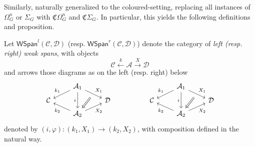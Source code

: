 \documentclass[a4paper,10pt
,draft
]{article}%
\renewcommand{\phi}{\varphi}
\newcommand{\UC}{\underline{\mathfrak C}}
\begin{document}
Similarly, \cite[Prop 3.47, 3.90, 4.12, 4.15, 4.26, 4.30]{BP17} naturally generalized to the coloured-setting,
replacing all instances of $\Omega_G^n$ or $\Sigma_G$ with $\UC\Omega_G^n$ and $\UC\Sigma_G$.
In particular, this yields the following definitions and proposition.
\begin{definition}[{cf. \cite[Defn 4.3]{BP17}}]
      Let $\mathsf{WSpan}^l(\mathcal C, \mathcal D)$ (resp. $\mathsf{WSpan}^r(\mathcal C, \mathcal D)$)
      denote the category of \textit{left (resp. right) weak spans}, with objects
      \begin{equation}
            \mathcal C \xleftarrow{k} \mathcal A \xrightarrow{X} \mathcal D
      \end{equation}
      and arrows those diagrams as on the left (resp. right) below
      \begin{equation}
            \begin{tikzcd}[row sep = tiny]
                  & \mathcal A_1 \arrow[dr, "X_1", ""'{name=U}] \arrow[dl, "k_1"'] \arrow[dd, "i"']
                  &
                  &&
                  &
                  \mathcal A_1 \arrow[dr, "X_1", ""'{name=A}] \arrow[dl, "k_1"'] \arrow[dd, "i"']
                  \\
                  \mathcal C
                  &&
                  \mathcal D
                  &&
                  \mathcal C
                  &&
                  \mathcal D
                  \\
                  & |[alias=V]| \mathcal A_2 \arrow[ur, "X_2"'] \arrow[ul, "k_2"]
                  &
                  &&
                  &
                  |[alias=B]| \mathcal A_2 \arrow[ur, "X_2"'] \arrow[ul, "k_2"]
                  \arrow[Rightarrow, from = U, to = V]
                  \arrow[Rightarrow, from = A, to = B]
            \end{tikzcd}
      \end{equation}
      denoted by $(i,\phi): (k_1,X_1) \to (k_2,X_2)$, with composition defined in the natural way.      
\end{definition}

\end{document}
